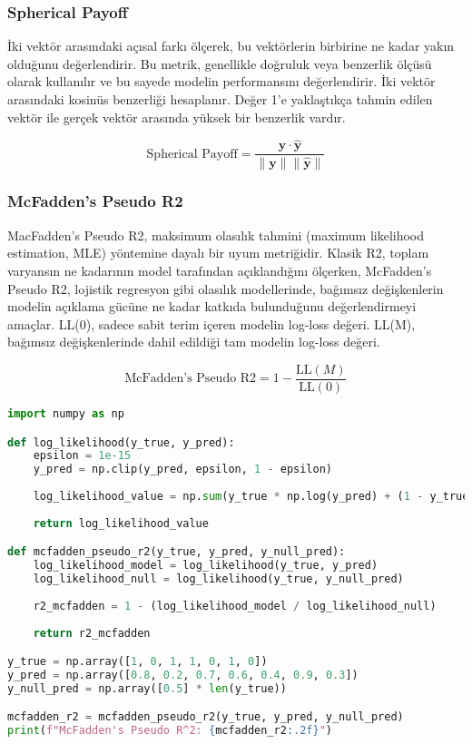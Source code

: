 \newpage

\subsubsection{Spherical Payoff}

İki vektör arasındaki açısal farkı ölçerek, bu vektörlerin birbirine ne kadar yakın olduğunu değerlendirir. Bu metrik, genellikle doğruluk veya benzerlik ölçüsü olarak kullanılır ve bu sayede modelin performansını değerlendirir. İki vektör arasındaki kosinüs benzerliği hesaplanır. Değer 1'e yaklaştıkça tahmin edilen vektör ile gerçek vektör arasında yüksek bir benzerlik vardır.

\[ \text{Spherical Payoff} = \frac{\mathbf{y} \cdot \mathbf{\hat{y}}}{\|\mathbf{y}\| \|\mathbf{\hat{y}}\|} \]

\newpage

\subsubsection{McFadden's Pseudo R2}

MacFadden's Pseudo R2, maksimum olasılık tahmini (maximum likelihood estimation, MLE) yöntemine dayalı bir uyum metriğidir. Klasik R2, toplam varyansın ne kadarının model tarafından açıklandığını ölçerken, McFadden's Pseudo R2, lojistik regresyon gibi olasılık modellerinde, bağımsız değişkenlerin modelin açıklama gücüne ne kadar katkıda bulunduğunu değerlendirmeyi amaçlar. LL(0), sadece sabit terim içeren modelin log-loss değeri. LL(M), bağımsız değişkenlerinde dahil edildiği tam modelin log-loss değeri.

\[ \text{McFadden's Pseudo R2} = 1 - \frac{\text{LL}(M)}{\text{LL}(0)} \]

\begin{lstlisting}[language=Python]
import numpy as np

def log_likelihood(y_true, y_pred):
    epsilon = 1e-15
    y_pred = np.clip(y_pred, epsilon, 1 - epsilon)
    
    log_likelihood_value = np.sum(y_true * np.log(y_pred) + (1 - y_true) * np.log(1 - y_pred))
    
    return log_likelihood_value

def mcfadden_pseudo_r2(y_true, y_pred, y_null_pred):
    log_likelihood_model = log_likelihood(y_true, y_pred)
    log_likelihood_null = log_likelihood(y_true, y_null_pred)
    
    r2_mcfadden = 1 - (log_likelihood_model / log_likelihood_null)
    
    return r2_mcfadden

y_true = np.array([1, 0, 1, 1, 0, 1, 0])
y_pred = np.array([0.8, 0.2, 0.7, 0.6, 0.4, 0.9, 0.3])
y_null_pred = np.array([0.5] * len(y_true))

mcfadden_r2 = mcfadden_pseudo_r2(y_true, y_pred, y_null_pred)
print(f"McFadden's Pseudo R^2: {mcfadden_r2:.2f}")
\end{lstlisting}

